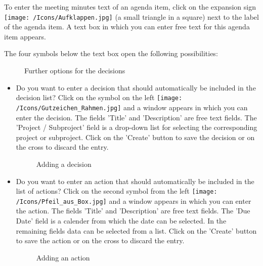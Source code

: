 To enter the meeting minutes text of an agenda item, click on the expansion sign \texttt{[image: /Icons/Aufklappen.jpg]}  (a small triangle in a square) next to the label of the agenda item. A text box in which you can enter free text for this agenda item  appears.

\vspace{\baselineskip}

The four symbols below the text box open the following possibilities:

\begin{figure}[H]
\caption{Further options for the decisions}
\end{figure}

\begin{itemize}
\item
Do you want to enter a decision that should automatically be included in the decision list? Click on the symbol on the left \texttt{[image: /Icons/Gutzeichen\_Rahmen.jpg]}  and a window appears in which you can enter the decision. The fields 'Title'  and 'Description'  are free text fields. The 'Project / Subproject' field  is a drop-down list for selecting the corresponding project or subproject. Click on the 'Create' button  to save the decision or on the cross  to discard the entry.

\begin{figure}[H]
\caption{Adding a decision}
\end{figure}

\end{itemize}

\begin{itemize}
\item
Do you want to enter an action that should automatically be included in the list of actions? Click on the second symbol from the left \texttt{[image: /Icons/Pfeil\_aus\_Box.jpg]}  and a window appears in which you can enter the action. The fields 'Title'  and 'Description'  are free text fields. The 'Due Date' field  is a calender from which the date can be selected. In the remaining fields  data can be selected from a list. Click on the 'Create' button  to save the action or on the cross  to discard the entry.

\begin{figure}[H]
\caption{Adding an action}
\end{figure}

\end{itemize}

